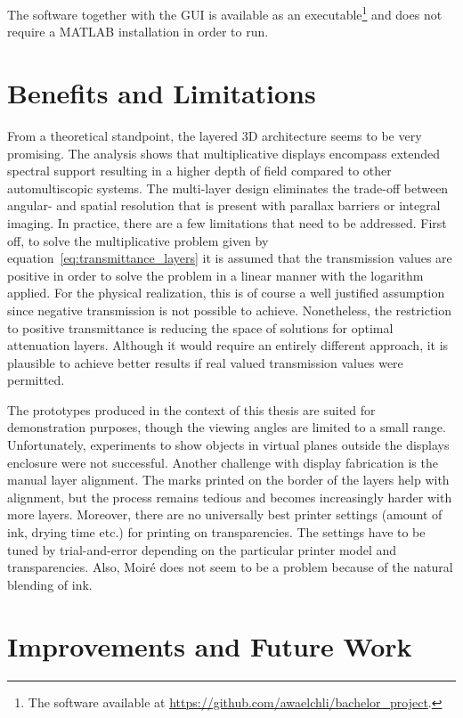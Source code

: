 The software together with the GUI is available as an executable\footnote{The software available at \url{https://github.com/awaelchli/bachelor_project}.} 
and does not require a \mbox{MATLAB} installation in order to run.

\section{Benefits and Limitations}
\label{sec:benefits_limitations}

From a theoretical standpoint, the layered 3D architecture seems to be very promising.
The analysis shows that multiplicative displays encompass extended spectral support resulting in a higher depth of field compared to other automultiscopic systems.
The multi-layer design eliminates the trade-off between angular- and spatial resolution that is present with parallax barriers or integral imaging.
In practice, there are a few limitations that need to be addressed.
First off, to solve the multiplicative problem given by equation~\ref{eq:transmittance_layers} it is assumed that the transmission values are positive in order to solve the problem in a linear manner with the logarithm applied.
For the physical realization, this is of course a well justified assumption since negative transmission is not possible to achieve.
Nonetheless, the restriction to positive transmittance is reducing the space of solutions for optimal attenuation layers.
Although it would require an entirely different approach, it is plausible to achieve better results if real valued transmission values were permitted.

The prototypes produced in the context of this thesis are suited for demonstration purposes, though the viewing angles are limited to a small range.
Unfortunately, experiments to show objects in virtual planes outside the displays enclosure were not successful.
Another challenge with display fabrication is the manual layer alignment.
The marks printed on the border of the layers help with alignment, but the process remains tedious and becomes increasingly harder with more layers.
Moreover, there are no universally best printer settings (amount of ink, drying time etc.) for printing on transparencies.
The settings have to be tuned by trial-and-error depending on the particular printer model and transparencies.
Also, Moir\'{e} does not seem to be a problem because of the natural blending of ink.

\section{Improvements and Future Work}
\label{sec:future_work}

